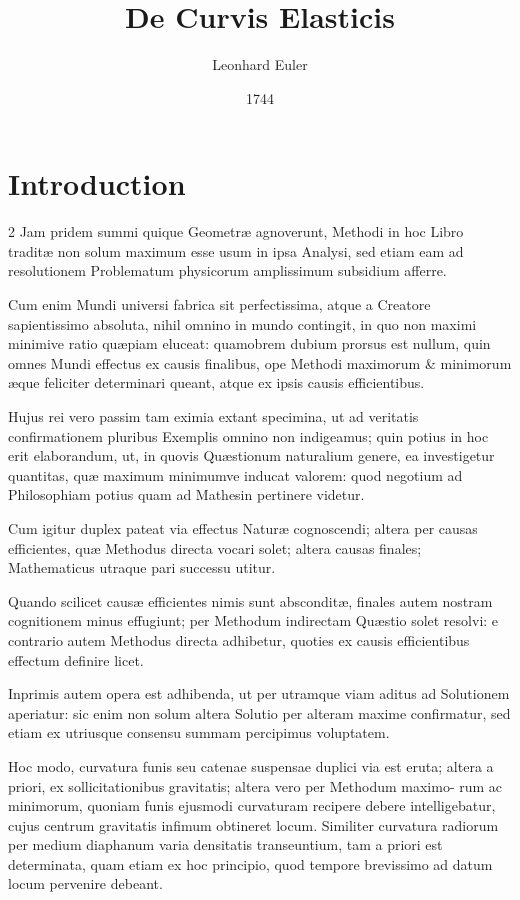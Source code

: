 \documentclass[a4paper,10pt]{article}
\title{De Curvis Elasticis}
\author{Leonhard Euler}
\date{1744}
\begin{document}
\setlength{\columnseprule}{1pt}

\maketitle

\section*{Introduction}
\begin{multicols}{2}
Jam pridem summi quique Geometræ agnoverunt, Methodi in hoc Libro traditæ non solum maximum esse usum in ipsa Analysi, sed etiam eam ad resolutionem Problematum physicorum amplissimum subsidium afferre.

Cum enim Mundi universi fabrica sit perfectissima, atque a Creatore sapientissimo absoluta, nihil omnino in mundo contingit, in quo non maximi minimive ratio quæpiam eluceat: quamobrem dubium prorsus est nullum, quin omnes Mundi effectus ex causis finalibus, ope Methodi maximorum \& minimorum æque feliciter determinari queant, atque ex ipsis causis efficientibus.

Hujus rei vero passim tam eximia extant specimina, ut ad veritatis confirmationem pluribus Exemplis omnino non indigeamus; quin potius in hoc erit elaborandum, ut, in quovis Quæstionum naturalium genere, ea investigetur quantitas, quæ maximum minimumve inducat valorem: quod negotium ad Philosophiam potius quam ad Mathesin pertinere videtur.

Cum igitur duplex pateat via effectus Naturæ cognoscendi; altera per causas efficientes, quæ Methodus directa vocari solet; altera causas finales;
Mathematicus utraque pari successu utitur.

Quando scilicet causæ efficientes nimis sunt absconditæ, finales autem nostram
cognitionem minus effugiunt; per Methodum indirectam Quæstio solet resolvi: e contrario autem Methodus directa adhibetur, quoties ex causis efficientibus effectum definire licet.

Inprimis autem opera est adhibenda, ut per utramque viam aditus ad Solutionem aperiatur: sic enim non solum altera Solutio per alteram maxime confirmatur, sed etiam ex utriusque consensu summam percipimus voluptatem.

Hoc modo, curvatura funis seu catenae suspensae duplici via est eruta; altera a priori, ex sollicitationibus gravitatis; altera vero per Methodum maximo-
rum ac minimorum, quoniam funis ejusmodi curvaturam recipere debere intelligebatur, cujus centrum gravitatis infimum obtineret locum. Similiter curvatura radiorum per medium diaphanum varia densitatis transeuntium, tam a priori est determinata, quam etiam ex hoc principio, quod tempore brevissimo
ad datum locum pervenire debeant.


\end{multicols}
\end{document}
